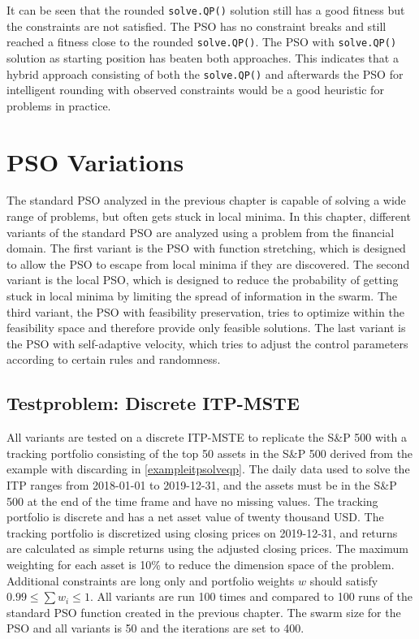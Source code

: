 \documentclass[
  oneside]{book}
\begin{document}
It can be seen that the rounded \texttt{solve.QP()} solution still has a good fitness but the constraints are not satisfied. The PSO has no constraint breaks and still reached a fitness close to the rounded \texttt{solve.QP()}. The PSO with \texttt{solve.QP()} solution as starting position has beaten both approaches. This indicates that a hybrid approach consisting of both the \texttt{solve.QP()} and afterwards the PSO for intelligent rounding with observed constraints would be a good heuristic for problems in practice.

\hypertarget{pso-variations}{%
\chapter{PSO Variations}\label{pso-variations}}

The standard PSO analyzed in the previous chapter is capable of solving a wide range of problems, but often gets stuck in local minima. In this chapter, different variants of the standard PSO are analyzed using a problem from the financial domain. The first variant is the PSO with function stretching, which is designed to allow the PSO to escape from local minima if they are discovered. The second variant is the local PSO, which is designed to reduce the probability of getting stuck in local minima by limiting the spread of information in the swarm. The third variant, the PSO with feasibility preservation, tries to optimize within the feasibility space and therefore provide only feasible solutions. The last variant is the PSO with self-adaptive velocity, which tries to adjust the control parameters according to certain rules and randomness.

\hypertarget{testproblem-discrete-itp-mste}{%
\section{Testproblem: Discrete ITP-MSTE}\label{testproblem-discrete-itp-mste}}

All variants are tested on a discrete ITP-MSTE to replicate the S\&P 500 with a tracking portfolio consisting of the top 50 assets in the S\&P 500 derived from the example with discarding in \ref{exampleitpsolveqp}. The daily data used to solve the ITP ranges from 2018-01-01 to 2019-12-31, and the assets must be in the S\&P 500 at the end of the time frame and have no missing values. The tracking portfolio is discrete and has a net asset value of twenty thousand USD. The tracking portfolio is discretized using closing prices on 2019-12-31, and returns are calculated as simple returns using the adjusted closing prices. The maximum weighting for each asset is 10\% to reduce the dimension space of the problem. Additional constraints are long only and portfolio weights \(w\) should satisfy \(0.99 \leq \textstyle\sum w_i \leq 1\). All variants are run 100 times and compared to 100 runs of the standard PSO function created in the previous chapter. The swarm size for the PSO and all variants is 50 and the iterations are set to 400.
\end{document}
